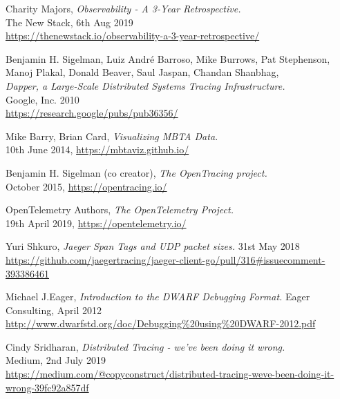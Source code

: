 \documentclass[12pt,pdftex,titlepage]{report}
\begin{document}
    \begin{thebibliography}{69}

        Charity Majors, \textit{Observability - A 3-Year Retrospective.} \\
        The New Stack, 6th Aug 2019 \\
        \url{https://thenewstack.io/observability-a-3-year-retrospective/}

        Benjamin H. Sigelman, Luiz André Barroso, Mike Burrows, Pat Stephenson, Manoj Plakal, Donald Beaver, Saul Jaspan, Chandan Shanbhag, \\
        \textit{Dapper, a Large-Scale Distributed Systems Tracing Infrastructure.} \\
        Google, Inc. 2010 \\
        \url{https://research.google/pubs/pub36356/}

        Mike Barry, Brian Card, \textit{Visualizing MBTA Data.} \\
        10th June 2014, \url{https://mbtaviz.github.io/}

        Benjamin H. Sigelman (co creator), \textit{The OpenTracing project.} \\
        October 2015, \url{https://opentracing.io/}

        OpenTelemetry Authors, \textit{The OpenTelemetry Project.} \\
        19th April 2019, \url{https://opentelemetry.io/}

        Yuri Shkuro, \textit{Jaeger Span Tags and UDP packet sizes.}
        31st May 2018 \\
        \url{https://github.com/jaegertracing/jaeger-client-go/pull/316#issuecomment-393386461}

        Michael J.Eager, \textit{Introduction to the DWARF Debugging Format.}
        Eager Consulting, April 2012 \\
        \url{http://www.dwarfstd.org/doc/Debugging%20using%20DWARF-2012.pdf}

        Cindy Sridharan, \textit{Distributed Tracing - we've been doing it wrong.} \\
        Medium, 2nd July 2019 \\
        \url{https://medium.com/@copyconstruct/distributed-tracing-weve-been-doing-it-wrong-39fc92a857df}


\end{thebibliography}
\end{document}
